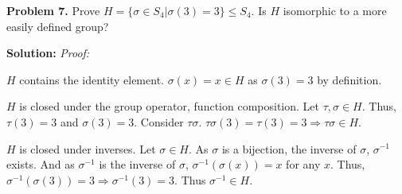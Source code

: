 \documentclass[12pt, letterpaper]{article}
\newenvironment{problem}
    [1]
    {\noindent \textbf{Problem #1.}}
    {\vspace{3mm}}
\newenvironment{solution}
    [0]
    {\noindent \textbf{Solution:}} 
    {\vspace{3mm}}
\begin{document}
\begin{problem}{7}
    Prove $H = \{\sigma \in S_4 | \sigma(3) = 3\} \le S_4$. Is $H$
    isomorphic to a more easily defined group?
\end{problem}

\begin{solution}
    \emph{Proof:} 

    \bigskip\noindent
    $H$ contains the identity element. $\sigma(x)=x \in H$ as $\sigma(3)=3$ by definition. 
    
    \bigskip\noindent
    $H$ is closed under the group operator, function composition. 
    Let $\tau, \sigma \in H$. Thus, $\tau(3)=3$ and $\sigma(3)=3$. Consider 
    $\tau\sigma$. $\tau\sigma(3) = \tau(3) = 3 \Rightarrow \tau\sigma
    \in H$.

    \bigskip\noindent
    $H$ is closed under inverses. Let $\sigma \in H$. As $\sigma$ is a bijection,
    the inverse of $\sigma$, $\sigma^{-1}$ exists. And as $\sigma^{-1}$ is the inverse
    of $\sigma$, $\sigma^{-1}(\sigma(x)) = x$ for any $x$. Thus, $\sigma^{-1}(\sigma(3)) = 
    3 \Rightarrow \sigma^{-1}(3) = 3$. Thus $\sigma^{-1} \in H$.
\end{solution}
\end{document}

